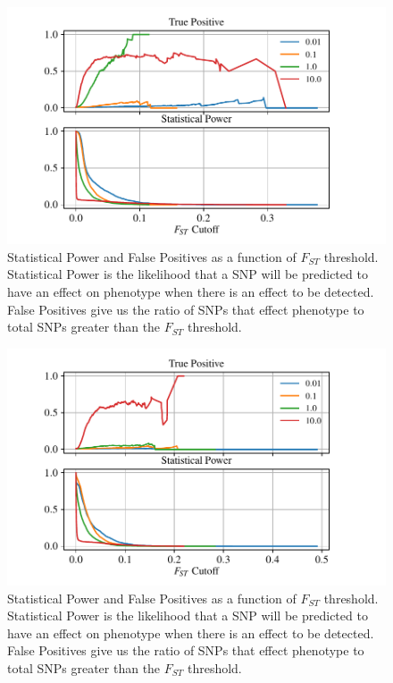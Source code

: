\documentclass{article}
\begin{document}
\begin{figure}
    \begin{center}
          \includegraphics{Final_Plots/True_Power_0_25_500.pdf}
          \caption{ 
        Statistical Power and False Positives as a function of $F_{ST}$ threshold. 
        Statistical Power is the likelihood that a SNP will be predicted to have an effect on phenotype when there is an effect to be detected.
        False Positives give us the ratio of SNPs that effect phenotype to total SNPs greater than the $F_{ST}$ threshold.
          \label{fig:Power_FP}
          }
    \end{center}
\end{figure}

\begin{figure}
    \begin{center}
        \includegraphics{Final_Plots/True_Power_0_5_500.pdf}
          \caption{ 
        Statistical Power and False Positives as a function of $F_{ST}$ threshold. 
        Statistical Power is the likelihood that a SNP will be predicted to have an effect on phenotype when there is an effect to be detected.
        False Positives give us the ratio of SNPs that effect phenotype to total SNPs greater than the $F_{ST}$ threshold.
         	}
          \label{fig:Power_FP_5lakes}
    \end{center}
\end{figure}
\end{document}
